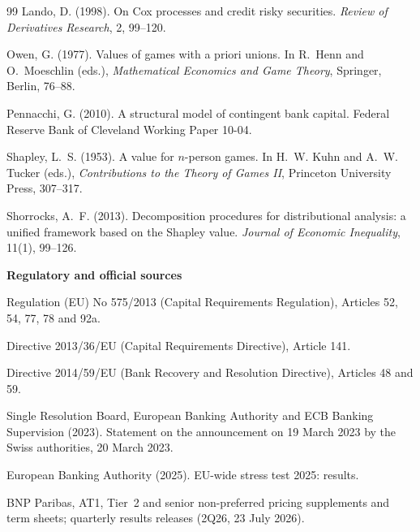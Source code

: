 \begin{thebibliography}{99}
Lando, D. (1998).
\newblock On Cox processes and credit risky securities.
\newblock \emph{Review of Derivatives Research}, 2, 99--120.

Owen, G. (1977).
\newblock Values of games with a priori unions.
\newblock In R.~Henn and O.~Moeschlin (eds.), \emph{Mathematical Economics and Game Theory},
  Springer, Berlin, 76--88.

Pennacchi, G. (2010).
\newblock A structural model of contingent bank capital.
\newblock Federal Reserve Bank of Cleveland Working Paper 10-04.

Shapley, L.~S. (1953).
\newblock A value for $n$-person games.
\newblock In H.~W. Kuhn and A.~W. Tucker (eds.), \emph{Contributions to the Theory of
  Games II}, Princeton University Press, 307--317.

Shorrocks, A.~F. (2013).
\newblock Decomposition procedures for distributional analysis: a unified framework based on
  the Shapley value.
\newblock \emph{Journal of Economic Inequality}, 11(1), 99--126.

\bigskip
\noindent\textbf{Regulatory and official sources}

\medskip\noindent
Regulation (EU) No 575/2013 (Capital Requirements Regulation), Articles 52, 54, 77, 78 and 92a.

\noindent
Directive 2013/36/EU (Capital Requirements Directive), Article 141.

\noindent
Directive 2014/59/EU (Bank Recovery and Resolution Directive), Articles 48 and 59.

\noindent
Single Resolution Board, European Banking Authority and ECB Banking Supervision (2023).
Statement on the announcement on 19 March 2023 by the Swiss authorities, 20 March 2023.

\noindent
European Banking Authority (2025). EU-wide stress test 2025: results.

\noindent
BNP Paribas, AT1, Tier~2 and senior non-preferred pricing supplements and term sheets;
quarterly results releases (2Q26, 23 July 2026).

\end{thebibliography}
